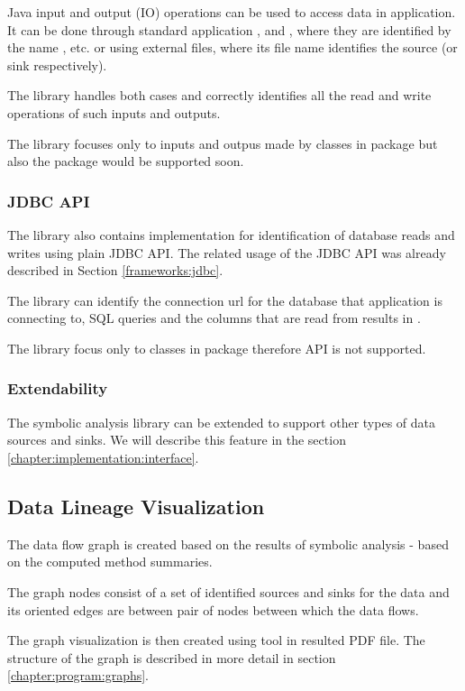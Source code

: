 Java input and output (IO) operations can be used to access data in application.
It can be done through standard application
,  and ,
where they are identified by the name , etc.
or using external files, where its file name identifies the source (or sink respectively).

The library handles both cases and correctly identifies
all the read and write operations of such inputs and outputs.

The library focuses only to inputs and outpus made by classes in  package
but also the  package would be supported soon.




\subsubsection{JDBC API}

The library also contains implementation for identification of
database reads and writes using plain JDBC API.
The related usage of the JDBC API was already described in Section \ref{frameworks:jdbc}.

The library can identify the connection url for the database
that application is connecting to, SQL queries and the columns
that are read from results in .

The library focus only to classes in package 
therefore  API is not supported.




\subsubsection{Extendability}

The symbolic analysis library can be extended to support other types
of data sources and sinks. We will describe this feature in the section \ref{chapter:implementation:interface}.



\subsection{Data Lineage Visualization}

The data flow graph is created based on the results of symbolic analysis - based on
the computed method summaries.

The graph nodes consist of a set of identified sources and sinks for the data
and its oriented edges are between pair of nodes between which the data flows.

The graph visualization is then created using \citet{Graphviz} tool in resulted PDF file.
The structure of the graph is described in more detail in section \ref{chapter:program:graphs}.



